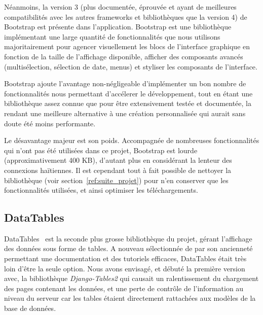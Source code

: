 \documentclass{EPL-master-thesis-covers-FR}
\begin{document}
				Néanmoins, la version 3 (plus documentée, éprouvée et ayant de meilleures compatibilités avec les autres frameworks et bibliothèques que la version 4) de Bootstrap est présente dans l'application. Bootstrap est une bibliothèque implémentant une large quantité de fonctionnalités que nous utilisons majoritairement pour agencer visuellement les blocs de l'interface graphique en fonction de la taille de l'affichage disponible, afficher des composants avancés (multisélection, sélection de date, menus) et styliser les composants de l'interface.

				Bootstrap ajoute l'avantage non-négligeable d'implémenter un bon nombre de fonctionnalités nous permettant d'accélerer le développement, tout en étant une bibliothèque assez connue que pour être extensivement testée et documentée, la rendant une meilleure alternative à une création personnalisée qui aurait sans doute été moins performante.

				Le désavantage majeur est son poids. Accompagnée de nombreuses fonctionnalités qui n'ont pas été utilisées dans ce projet, Bootstrap est lourde (approximativement 400 KB), d'autant plus en considérant la lenteur des connexions haïtiennes. Il est cependant tout à fait possible de nettoyer la bibliothèque (voir section~\ref{ref:suite_projet}) pour n'en conserver que les fonctionnalités utilisées, et ainsi optimiser les téléchargements.

			\subsection*{DataTables}

				DataTables~\cite{ref:datatables} est la seconde plus grosse bibliothèque du projet, gérant l'affichage des données sous forme de tables. A nouveau sélectionnée de par son ancienneté permettant une documentation et des tutoriels efficaces, DataTables était très loin d'être la seule option. Nous avons envisagé, et débuté la première version avec, la bibliothèque \emph{Django-Tables2} qui causait un ralentissement du chargement des pages contenant les données, et une perte de contrôle de l'information au niveau du serveur car les tables étaient directement rattachées aux modèles de la base de données.
\end{document}
